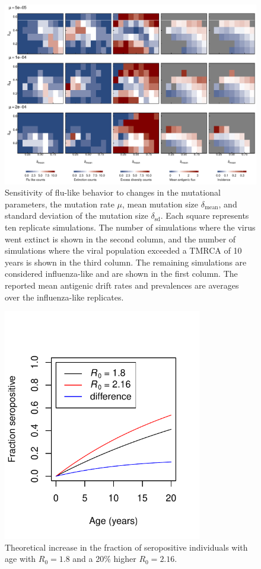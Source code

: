 \documentclass[10pt]{article}
\begin{document}
\newpage
\begin{figure}[h!]
\centerline{\includegraphics[width=7in]{./manuscript/figures/sensitivity_analysis/sensitivity_analysis.pdf}}
\caption{Sensitivity of flu-like behavior to changes in the mutational parameters, the mutation rate $\mu$, mean mutation size $\delta_\text{mean}$, and standard deviation of the mutation size $\delta_\text{sd}$. 
Each square represents ten replicate simulations. 
The number of simulations where the virus went extinct is shown in the second column, and the number of simulations where the viral population exceeded a TMRCA of 10 years is shown in the third column. 
The remaining simulations are considered influenza-like and are shown in the first column. 
The reported mean antigenic drift rates and prevalences are averages over the influenza-like replicates.}
\label{fig:sensitivity_analysis}
\end{figure}

\newpage
\begin{figure}[h!]
\centerline{\includegraphics[width=3.42in]{./manuscript/figures/SIR_seropositivity/SIR_seropositivity.pdf}}
\caption{Theoretical increase in the fraction of seropositive individuals with age with $R_0=1.8$ and a 20\% higher $R_0 = 2.16$.}
\label{fig:SIR_seropositivity}
\end{figure}
\end{document}
